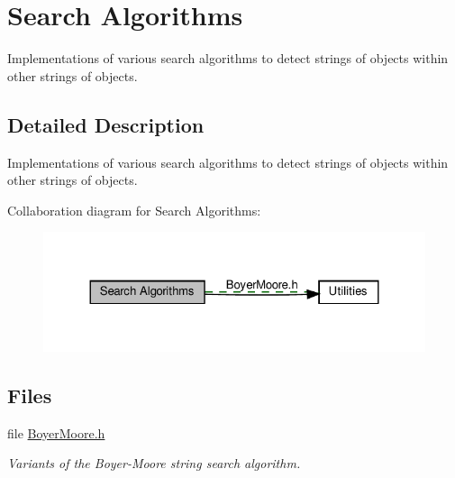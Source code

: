 \hypertarget{group__search__utils}{}\section{Search Algorithms}
\label{group__search__utils}


Implementations of various search algorithms to detect strings of objects within other strings of objects.  




\subsection{Detailed Description}
Implementations of various search algorithms to detect strings of objects within other strings of objects. 

Collaboration diagram for Search Algorithms\+:
\nopagebreak
\begin{figure}[H]
\begin{center}
\leavevmode
\includegraphics[width=324pt]{group__search__utils}
\end{center}
\end{figure}
\subsection*{Files}
\begin{DoxyCompactItemize}
\item 
file \hyperlink{BoyerMoore_8h}{Boyer\+Moore.\+h}
\begin{DoxyCompactList}\small\item\em Variants of the Boyer-\/\+Moore string search algorithm. \end{DoxyCompactList}\end{DoxyCompactItemize}
